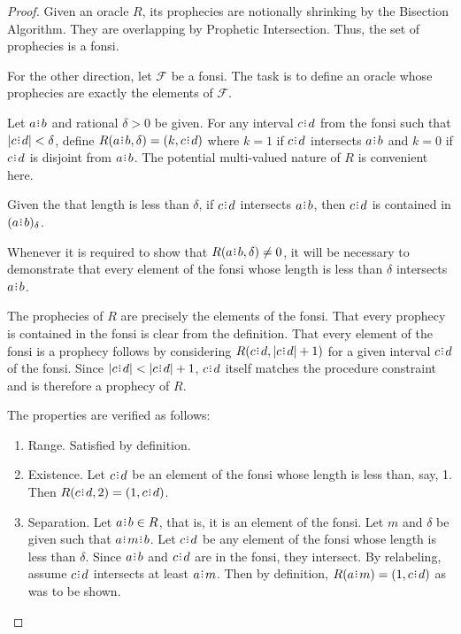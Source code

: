 \documentclass[12pt]{article}
\begin{document}
\begin{proof}
    Given an oracle $R$, its prophecies are notionally shrinking by the Bisection Algorithm. They are overlapping by Prophetic Intersection. Thus, the set of prophecies is a fonsi. 

    For the other direction, let $\mathcal{F}$ be a fonsi. The task is to define an oracle whose prophecies are exactly the elements of $\mathcal{F}$.
    
    Let $a\rint b$ and rational $\delta>0$ be given. For any interval $c\rint d$ from the fonsi such that $|c\rint d| < \delta$, define $R(a \rint b, \delta) = (k, c\rint d)$ where $k=1$ if $c\rint d$ intersects $a \rint b$ and $k=0$ if $c \rint d$ is disjoint from $a \rint b$. The potential multi-valued nature of $R$ is convenient here. 

    Given the that length is less than $\delta$, if $c\rint d$ intersects $a\rint b$, then  $c\rint d$ is contained in $\halo{a\rint b}$. 

    Whenever it is required to show that $R(a\rint b, \delta) \neq 0$, it will be necessary to demonstrate that every element of the fonsi whose length is less than $\delta$ intersects $a\rint b$. 
    
    The prophecies of $R$ are precisely the elements of the fonsi. That every prophecy is contained in the fonsi is clear from the definition. That every element of the fonsi is a prophecy follows by considering $R(c\rint d, |c\rint d|+1)$ for a given interval $c\rint d$ of the fonsi. Since $|c\rint d| < |c\rint d|+1$, $c\rint d$ itself matches the procedure constraint and is therefore a prophecy of $R$. 

    The properties are verified as follows:  
    \begin{enumerate}
        \item Range. Satisfied by definition. 
        \item Existence. Let $c \rint d$ be an element of the fonsi whose length is less than, say, 1. Then $R(c \rint d, 2) = (1, c \rint d)$.
        \item Separation. 
        Let $a\rint b \in R$, that is, it is an element of the fonsi. Let $m$ and $\delta$ be given such that $a\rint m\rint b$. Let $c\rint d$ be any element of the fonsi whose length is less than $\delta$. Since $a\rint b$ and $c\rint d$ are in the fonsi, they intersect. By relabeling, assume $c \rint d$ intersects at least $a \rint m$. Then by definition, $R(a \rint m) = (1, c \rint d)$ as was to be shown. 
        

\end{enumerate}
\end{proof}
\end{document}
